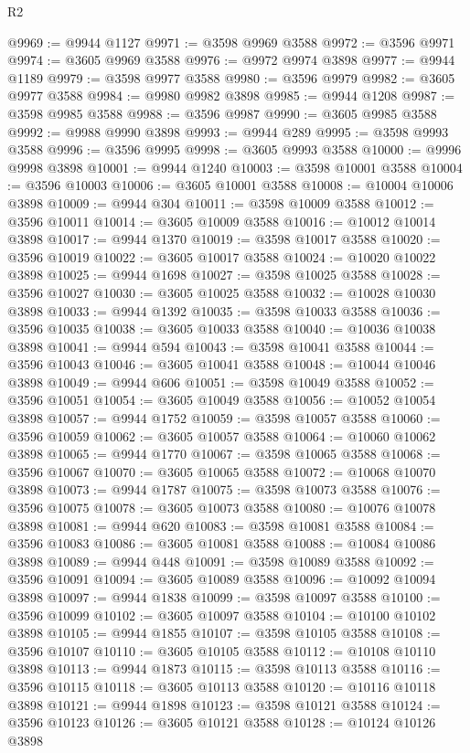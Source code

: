 \begin{lexlean}{R2}
\begin{coremodule}
@9969 := @9944 @1127
@9971 := @3598 @9969 @3588
@9972 := @3596 @9971
@9974 := @3605 @9969 @3588
@9976 := @9972 @9974 @3898
@9977 := @9944 @1189
@9979 := @3598 @9977 @3588
@9980 := @3596 @9979
@9982 := @3605 @9977 @3588
@9984 := @9980 @9982 @3898
@9985 := @9944 @1208
@9987 := @3598 @9985 @3588
@9988 := @3596 @9987
@9990 := @3605 @9985 @3588
@9992 := @9988 @9990 @3898
@9993 := @9944 @289
@9995 := @3598 @9993 @3588
@9996 := @3596 @9995
@9998 := @3605 @9993 @3588
@10000 := @9996 @9998 @3898
@10001 := @9944 @1240
@10003 := @3598 @10001 @3588
@10004 := @3596 @10003
@10006 := @3605 @10001 @3588
@10008 := @10004 @10006 @3898
@10009 := @9944 @304
@10011 := @3598 @10009 @3588
@10012 := @3596 @10011
@10014 := @3605 @10009 @3588
@10016 := @10012 @10014 @3898
@10017 := @9944 @1370
@10019 := @3598 @10017 @3588
@10020 := @3596 @10019
@10022 := @3605 @10017 @3588
@10024 := @10020 @10022 @3898
@10025 := @9944 @1698
@10027 := @3598 @10025 @3588
@10028 := @3596 @10027
@10030 := @3605 @10025 @3588
@10032 := @10028 @10030 @3898
@10033 := @9944 @1392
@10035 := @3598 @10033 @3588
@10036 := @3596 @10035
@10038 := @3605 @10033 @3588
@10040 := @10036 @10038 @3898
@10041 := @9944 @594
@10043 := @3598 @10041 @3588
@10044 := @3596 @10043
@10046 := @3605 @10041 @3588
@10048 := @10044 @10046 @3898
@10049 := @9944 @606
@10051 := @3598 @10049 @3588
@10052 := @3596 @10051
@10054 := @3605 @10049 @3588
@10056 := @10052 @10054 @3898
@10057 := @9944 @1752
@10059 := @3598 @10057 @3588
@10060 := @3596 @10059
@10062 := @3605 @10057 @3588
@10064 := @10060 @10062 @3898
@10065 := @9944 @1770
@10067 := @3598 @10065 @3588
@10068 := @3596 @10067
@10070 := @3605 @10065 @3588
@10072 := @10068 @10070 @3898
@10073 := @9944 @1787
@10075 := @3598 @10073 @3588
@10076 := @3596 @10075
@10078 := @3605 @10073 @3588
@10080 := @10076 @10078 @3898
@10081 := @9944 @620
@10083 := @3598 @10081 @3588
@10084 := @3596 @10083
@10086 := @3605 @10081 @3588
@10088 := @10084 @10086 @3898
@10089 := @9944 @448
@10091 := @3598 @10089 @3588
@10092 := @3596 @10091
@10094 := @3605 @10089 @3588
@10096 := @10092 @10094 @3898
@10097 := @9944 @1838
@10099 := @3598 @10097 @3588
@10100 := @3596 @10099
@10102 := @3605 @10097 @3588
@10104 := @10100 @10102 @3898
@10105 := @9944 @1855
@10107 := @3598 @10105 @3588
@10108 := @3596 @10107
@10110 := @3605 @10105 @3588
@10112 := @10108 @10110 @3898
@10113 := @9944 @1873
@10115 := @3598 @10113 @3588
@10116 := @3596 @10115
@10118 := @3605 @10113 @3588
@10120 := @10116 @10118 @3898
@10121 := @9944 @1898
@10123 := @3598 @10121 @3588
@10124 := @3596 @10123
@10126 := @3605 @10121 @3588
@10128 := @10124 @10126 @3898

\end{coremodule}
\end{lexlean}
